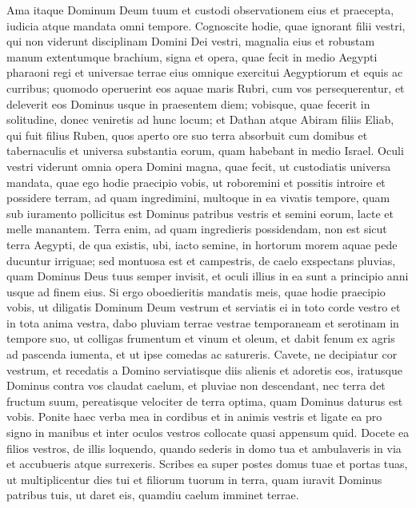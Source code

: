\begin{biblechapter}
\begin{biblechapter}
\begin{biblechapter}
\begin{biblechapter}
\begin{biblechapter}
\begin{biblechapter}
\begin{biblechapter}
\begin{biblechapter}
\begin{biblechapter}
\begin{biblechapter}
\begin{biblechapter}
\verse Ama itaque Dominum Deum tuum et custodi observationem eius et praecepta, iudicia atque mandata omni tempore.
 \verse Cognoscite hodie, quae ignorant filii vestri, qui non viderunt disciplinam Domini Dei vestri, magnalia eius et robustam manum extentumque brachium, 
\verse signa et opera, quae fecit in medio Aegypti pharaoni regi et universae terrae eius 
\verse omnique exercitui Aegyptiorum et equis ac curribus; quomodo operuerint eos aquae maris Rubri, cum vos persequerentur, et deleverit eos Dominus usque in praesentem diem; 
\verse vobisque, quae fecerit in solitudine, donec veniretis ad hunc locum; 
\verse et Dathan atque Abiram filiis Eliab, qui fuit filius Ruben, quos aperto ore suo terra absorbuit cum domibus et tabernaculis et universa substantia eorum, quam habebant in medio Israel.
 \verse Oculi vestri viderunt omnia opera Domini magna, quae fecit, 
\verse ut custodiatis universa mandata, quae ego hodie praecipio vobis, ut roboremini et possitis introire et possidere terram, ad quam ingredimini, 
\verse multoque in ea vivatis tempore, quam sub iuramento pollicitus est Dominus patribus vestris et semini eorum, lacte et melle manantem. 
\verse Terra enim, ad quam ingredieris possidendam, non est sicut terra Aegypti, de qua existis, ubi, iacto semine, in hortorum morem aquae pede ducuntur irriguae; 
\verse sed montuosa est et campestris, de caelo exspectans pluvias, 
\verse quam Dominus Deus tuus semper invisit, et oculi illius in ea sunt a principio anni usque ad finem eius.
 \verse Si ergo oboedieritis mandatis meis, quae hodie praecipio vobis, ut diligatis Dominum Deum vestrum et serviatis ei in toto corde vestro et in tota anima vestra, 
\verse dabo pluviam terrae vestrae temporaneam et serotinam in tempore suo, ut colligas frumentum et vinum et oleum, 
\verse et dabit fenum ex agris ad pascenda iumenta, et ut ipse comedas ac satureris. 
\verse Cavete, ne decipiatur cor vestrum, et recedatis a Domino serviatisque diis alienis et adoretis eos, 
 \verse iratusque Dominus contra vos claudat caelum, et pluviae non descendant, nec terra det fructum suum, pereatisque velociter de terra optima, quam Dominus daturus est vobis.
 \verse Ponite haec verba mea in cordibus et in animis vestris et ligate ea pro signo in manibus et inter oculos vestros collocate quasi appensum quid. 
\verse Docete ea filios vestros, de illis loquendo, quando sederis in domo tua et ambulaveris in via et accubueris atque surrexeris. 
\verse Scribes ea super postes domus tuae et portas tuas, 
\verse ut multiplicentur dies tui et filiorum tuorum in terra, quam iuravit Dominus patribus tuis, ut daret eis, quamdiu caelum imminet terrae. 

\end{biblechapter}
\end{biblechapter}
\end{biblechapter}
\end{biblechapter}
\end{biblechapter}
\end{biblechapter}
\end{biblechapter}
\end{biblechapter}
\end{biblechapter}
\end{biblechapter}
\end{biblechapter}
